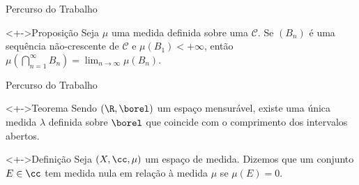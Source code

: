 	\begin{frame}{Percurso do Trabalho}
		\begin{block}<+->{Proposição}
			\justify Seja $\mu$ uma medida definida sobre uma \sigal $\mathcal{C}$.
			Se $(B_n)$ é uma sequência não-crescente de $\mathcal{C}$ e $\mu(B_1) < +\infty$, então 
			$\mu\left(\displaystyle \bigcap_{n = 1}^\infty B_n\right) = \displaystyle\lim_{n \to \infty} \mu(B_n)$.
		\end{block}
	\end{frame}
	
	\begin{frame}{Percurso do Trabalho}
		\begin{block}<+->{Teorema}
			\justify Sendo $(\R, \borel)$ um espaço mensurável, existe uma única medida $\lambda$ definida sobre $\borel$ que coincide com o comprimento dos intervalos abertos.
		\end{block}
		\begin{block}<+->{Definição}
			\justify Seja $(X, \cc, \mu)$ um espaço de medida.
			Dizemos que um conjunto $E \in \cc$ tem medida nula em relação à medida $\mu$ se $\mu(E) = 0$.
		\end{block}
	\end{frame}

